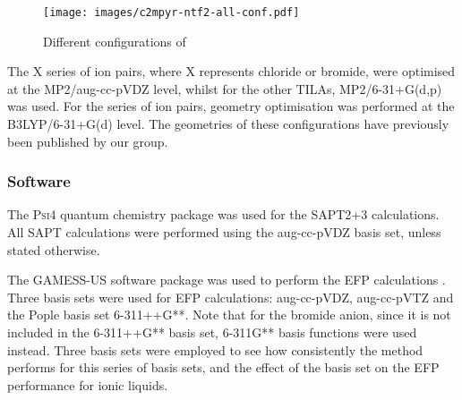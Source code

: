 
\begin{figure}
    \centering
    \texttt{[image: images/c2mpyr-ntf2-all-conf.pdf]}
    \caption{Different configurations of \protect{} \label{fig:conf-c2mpyr-ntf2}}
\end{figure}

The X series of ion pairs, where X represents chloride or bromide, were optimised at the MP2/aug-cc-pVDZ level, whilst for the other TILAs, MP2/6-31+G(d,p) was used.
For the  series of ion pairs, geometry optimisation was performed at the B3LYP/6-31+G(d) level.
The geometries of these configurations have previously been published by our group.
\cite{Izgorodina2014a, Rigby2014a}


\subsubsection{Software}

The \textsc{Psi4} quantum chemistry package was used for the SAPT2+3 calculations. 
\cite{Turney2012a}
All SAPT calculations were performed using the aug-cc-pVDZ basis set, unless stated otherwise.
\cite{Izgorodina2014a}

The GAMESS-US software package was used to perform the EFP calculations
\cite{Schmidt1993a, Gordon2005a}.
Three basis sets were used for EFP calculations: aug-cc-pVDZ, aug-cc-pVTZ and the Pople basis set 6-311++G**. Note that for the bromide anion, since it is not included in the 6-311++G** basis set, 6-311G** basis functions were used instead.
Three basis sets were employed to see how consistently the method performs for this series of basis sets, and the effect of the basis set on the EFP performance for ionic liquids.

